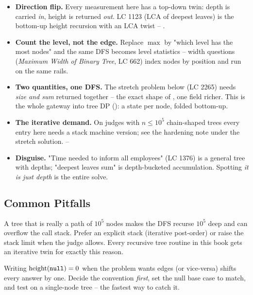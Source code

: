 \begin{itemize}
  \item \textbf{Direction flip.} Every measurement here has a top-down twin: depth is
        carried \emph{in}, height is returned \emph{out}. LC 1123 (LCA of deepest
        leaves) is the bottom-up height recursion with an LCA twist -- .
        \hfill{}
  \item \textbf{Count the level, not the edge.} Replace $\max$ by "which level has the
        most nodes" and the same DFS becomes level statistics -- width
        questions (\textit{Maximum Width of Binary Tree}, LC 662) index nodes by
        position and run on the same rails. \hfill{}
  \item \textbf{Two quantities, one DFS.} The stretch problem below (LC 2265) needs
        \emph{size and sum} returned together -- the exact shape of
        , one field richer. This is the whole gateway into
        tree DP (): a state per node, folded bottom-up. \hfill{}
  \item \textbf{The iterative demand.} On judges with $n \le 10^{5}$ chain-shaped
        trees every entry here needs a stack machine version; see the hardening note
        under the stretch solution. \hfill{}--
  \item \textbf{Disguise.} "Time needed to inform all employees" (LC 1376) is a
        general tree with depths; "deepest leaves sum" is depth-bucketed accumulation.
        Spotting \emph{it is just depth} is the entire solve.
\end{itemize}

\subsection{Common Pitfalls}

\begin{warningbox}
A tree that is really a path of $10^5$ nodes makes the DFS recurse $10^5$ deep and can
overflow the call stack. Prefer an explicit stack (iterative post-order) or raise the
stack limit when the judge allows. Every recursive tree routine in this book gets an
iterative twin for exactly this reason.
\end{warningbox}

\begin{warningbox}
Writing $\operatorname{height}(\texttt{null})=0$ when the problem wants edges (or vice-versa) shifts every
answer by one. Decide the convention \emph{first}, set the null base case to match, and
test on a single-node tree -- the fastest way to catch it.
\end{warningbox}

